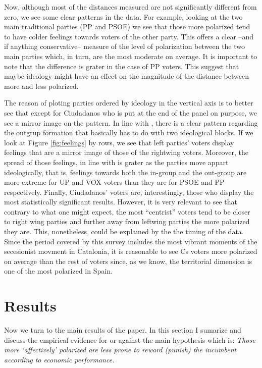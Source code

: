 \documentclass[a4paper, svgnames]{article}
\begin{document}
Now, although most of the distances measured are not significantly different from zero, we see some clear patterns in the data. For example, looking at the two main traditional parties (PP and PSOE) we see that those more polarized tend to have colder feelings towards voters of the other party. This offers a clear --and if anything conservative-- measure of the level of polarization between the two main parties which, in turn, are the most moderate on average. It is important to note that the difference is grater in the case of PP voters. This suggest that maybe ideology might have an effect on the magnitude of the distance between more and less polarized. 

The reason of ploting parties ordered by ideology in the vertical axis is to better see that except for Ciudadanos who is put at the end of the panel on purpose, we see a mirror image on the pattern. In line with \citep*{Orriols2020}, there is a clear pattern regarding the outgrup formation that basically has to do with two ideological blocks. If we look at Figure \ref*{fig:feelings} by rows, we see that left parties' voters display feelings that are a mirror image of those of the rightwing voters. Moreover, the spread of those feelings, in line with \citep*{Wagner2021} is grater as the parties move appart ideologically, that is, feelings towards both the in-group and the  out-group are more extreme for UP and VOX voters than they are for PSOE and PP respectively. Finally, Ciudadanos' voters are, interestingly, those who display the most statistically significant results. However, it is very relevant to see that contrary to what one might expect, the most ``centrist'' voters tend to be closer to right wing parties and further away from leftwing parties the more polarized they are. This, nonetheless, could be explained by the the timing of the data. Since the period covered by this survey includes the most vibrant moments of the secesionist movment in Catalonia, it is reasonable to see Cs voters more polarized on average than the rest of voters since, as we know, the territorial dimension is one of the most polarized in Spain.

\section{Results}

Now we turn to the main results of the paper. In this section I sumarize and discuss the empirical evidence for or against the main hypothesis which is: \textit{Those more `affectively' polarized are less prone to reward (punish) the incumbent according to economic performance.}
\end{document}
